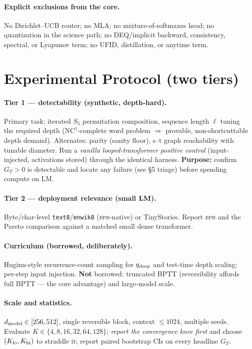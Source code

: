 \documentclass[11pt]{article}
\newcommand{\bpb}{\textsc{bpb}}\newcommand{\code}[1]{\texttt{#1}}
\begin{document}
\paragraph{Explicit exclusions from the core.} No Dirichlet--UCB router; no MLA; no mixture-of-softmaxes head; no quantization in the science path; no DEQ/implicit backward, consistency, spectral, or Lyapunov term; no UFID, distillation, or anytime term.

\section{Experimental Protocol (two tiers)}
\paragraph{Tier 1 --- detectability (synthetic, depth-hard).} Primary task: iterated $S_5$ permutation composition, sequence length $\ell$ tuning the required depth ($\mathrm{NC}^1$-complete word problem $\Rightarrow$ provable, non-shortcuttable depth demand). Alternates: parity (sanity floor), s--t graph reachability with tunable diameter. Run a \emph{vanilla looped-transformer positive control} (input-injected, activations stored) through the identical harness. \textbf{Purpose:} confirm $G_T>0$ is detectable and locate any failure (see \S5 triage) before spending compute on LM.
\paragraph{Tier 2 --- deployment relevance (small LM).} Byte/char-level \code{text8}/\code{enwik8} (\bpb-native) or TinyStories. Report \bpb{} and the Pareto comparison against a matched small dense transformer.
\paragraph{Curriculum (borrowed, deliberately).} Huginn-style recurrence-count sampling for $q_{\rm deep}$ and test-time depth scaling; per-step input injection. \textbf{Not} borrowed: truncated BPTT (reversibility affords full BPTT --- the core advantage) and large-model scale.
\paragraph{Scale and statistics.} $d_{\rm model}\in[256,512]$, single reversible block, context $\le1024$, multiple seeds. Evaluate $K\in\{4,8,16,32,64,128\}$; \emph{report the convergence knee first} and choose $(K_{\rm lo},K_{\rm hi})$ to straddle it; report paired bootstrap CIs on every headline $G_T$.
\end{document}
